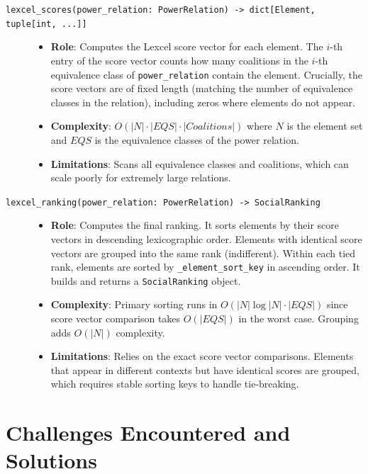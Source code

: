 \documentclass[11pt]{article}
\newcommand{\pathitem}[1]{\texttt{#1}}
\begin{document}
\begin{description}
  \item[\pathitem{lexcel\_scores(power\_relation: PowerRelation) -> dict[Element, tuple[int, ...]]}]
  \begin{itemize}
    \item \textbf{Role}: Computes the Lexcel score vector for each element. The $i$-th entry of the score vector counts how many coalitions in the $i$-th equivalence class of \texttt{power\_relation} contain the element. Crucially, the score vectors are of fixed length (matching the number of equivalence classes in the relation), including zeros where elements do not appear.
    \item \textbf{Complexity}: $O(|N| \cdot |EQS| \cdot |Coalitions|)$ where $N$ is the element set and $EQS$ is the equivalence classes of the power relation.
    \item \textbf{Limitations}: Scans all equivalence classes and coalitions, which can scale poorly for extremely large relations.
  \end{itemize}

  \item[\pathitem{lexcel\_ranking(power\_relation: PowerRelation) -> SocialRanking}]
  \begin{itemize}
    \item \textbf{Role}: Computes the final ranking. It sorts elements by their score vectors in descending lexicographic order. Elements with identical score vectors are grouped into the same rank (indifferent). Within each tied rank, elements are sorted by \pathitem{\_element\_sort\_key} in ascending order. It builds and returns a \pathitem{SocialRanking} object.
    \item \textbf{Complexity}: Primary sorting runs in $O(|N| \log |N| \cdot |EQS|)$ since score vector comparison takes $O(|EQS|)$ in the worst case. Grouping adds $O(|N|)$ complexity.
    \item \textbf{Limitations}: Relies on the exact score vector comparisons. Elements that appear in different contexts but have identical scores are grouped, which requires stable sorting keys to handle tie-breaking.
  \end{itemize}
\end{description}

\section{Challenges Encountered and Solutions}
\end{document}
